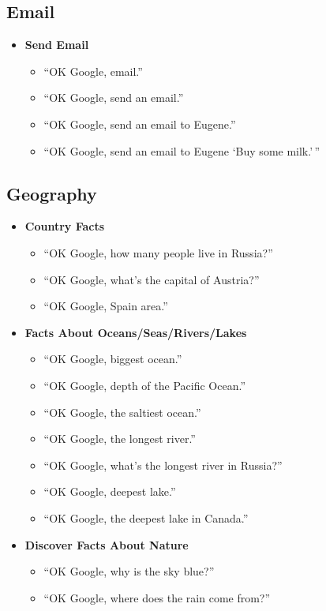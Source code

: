 \documentclass[
  jou,
  floatsintext,
  longtable,
  a4paper,
  nolmodern,
  notxfonts,
  notimes,
  colorlinks=true,linkcolor=blue,citecolor=blue,urlcolor=blue]{apa7}
\providecommand{\tightlist}{%
  \setlength{\itemsep}{0pt}\setlength{\parskip}{0pt}}
\begin{document}
\subsection{Email}\label{email}

\begin{itemize}
\tightlist
\item
  \textbf{Send Email}

  \begin{itemize}
  \tightlist
  \item
    ``OK Google, email.''
  \item
    ``OK Google, send an email.''
  \item
    ``OK Google, send an email to Eugene.''
  \item
    ``OK Google, send an email to Eugene `Buy some milk.'\,''
  \end{itemize}
\end{itemize}

\subsection{Geography}\label{geography}

\begin{itemize}
\tightlist
\item
  \textbf{Country Facts}

  \begin{itemize}
  \tightlist
  \item
    ``OK Google, how many people live in Russia?''
  \item
    ``OK Google, what's the capital of Austria?''
  \item
    ``OK Google, Spain area.''
  \end{itemize}
\item
  \textbf{Facts About Oceans/Seas/Rivers/Lakes}

  \begin{itemize}
  \tightlist
  \item
    ``OK Google, biggest ocean.''
  \item
    ``OK Google, depth of the Pacific Ocean.''
  \item
    ``OK Google, the saltiest ocean.''
  \item
    ``OK Google, the longest river.''
  \item
    ``OK Google, what's the longest river in Russia?''
  \item
    ``OK Google, deepest lake.''
  \item
    ``OK Google, the deepest lake in Canada.''
  \end{itemize}
\item
  \textbf{Discover Facts About Nature}

  \begin{itemize}
  \tightlist
  \item
    ``OK Google, why is the sky blue?''
  \item
    ``OK Google, where does the rain come from?''
  \end{itemize}
\end{itemize}
\end{document}

